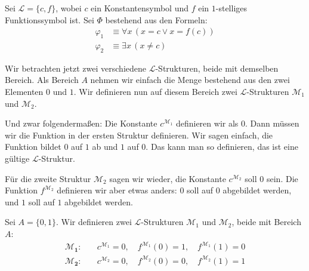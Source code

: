 \begin{math-stroke}
Sei $\mathcal{L} = \{c, f\}$, wobei $c$ ein Konstantensymbol und $f$ ein $1$-stelliges Funktionssymbol ist.
Sei $\Phi$ bestehend aus den Formeln:
\begin{align*}
\varphi_1 &\equiv \forall x \, (x = c \lor x = f(c)) \\
\varphi_2 &\equiv \exists x \, (x \neq c)
\end{align*}
\end{math-stroke}

\begin{spoken-clean}[01:10:33 - 01:12:33]
Wir betrachten jetzt zwei verschiedene $\mathcal{L}$-Strukturen, beide mit demselben Bereich. Als Bereich $A$ nehmen wir einfach die Menge bestehend aus den zwei Elementen $0$ und $1$. Wir definieren nun auf diesem Bereich zwei $\mathcal{L}$-Strukturen $\mathcal{M}_1$ und $\mathcal{M}_2$.

Und zwar folgendermaßen: Die Konstante $c^{\mathcal{M}_1}$ definieren wir als $0$. Dann müssen wir die Funktion in der ersten Struktur definieren. Wir sagen einfach, die Funktion bildet $0$ auf $1$ ab und $1$ auf $0$. Das kann man so definieren, das ist eine gültige $\mathcal{L}$-Struktur.

Für die zweite Struktur $\mathcal{M}_2$ sagen wir wieder, die Konstante $c^{\mathcal{M}_2}$ soll $0$ sein. Die Funktion $f^{\mathcal{M}_2}$ definieren wir aber etwas anders: $0$ soll auf $0$ abgebildet werden, und $1$ soll auf $1$ abgebildet werden.
\end{spoken-clean}

\begin{math-stroke}
Sei $A = \{0, 1\}$. Wir definieren zwei $\mathcal{L}$-Strukturen $\mathcal{M}_1$ und $\mathcal{M}_2$, beide mit Bereich $A$:
\begin{align*}
\mathbf{\mathcal{M}_1}\colon &\quad c^{\mathcal{M}_1} = 0, \quad f^{\mathcal{M}_1}(0) = 1, \quad f^{\mathcal{M}_1}(1) = 0 \\
\mathbf{\mathcal{M}_2}\colon &\quad c^{\mathcal{M}_2} = 0, \quad f^{\mathcal{M}_2}(0) = 0, \quad f^{\mathcal{M}_2}(1) = 1
\end{align*}
\end{math-stroke}

